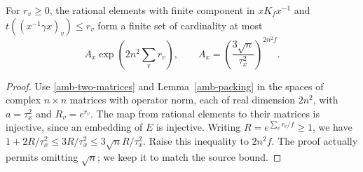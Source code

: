 \begin{corollary}\label{amb-rational-ball}
For $r_v\ge0$, the rational elements with finite component in
$xK_fx^{-1}$ and $t((x^{-1}\gamma x)_v)\le r_v$ form a finite
set of cardinality at most
\begin{equation}\label{amb-ball-bound}
 A_x\exp\left(2n^2\sum_vr_v\right),\qquad
                   A_x=\left(\frac{3\sqrt n}{\tau_x^2}\right)^{2n^2f}.
\end{equation}
\end{corollary}
\begin{proof}
Use \eqref{amb-two-matrices} and Lemma~\ref{amb-packing} in the
spaces of complex $n\times n$ matrices with operator norm,
each of real dimension $2n^2$, with $a=\tau_x^2$ and
$R_v=e^{r_v}$. The map from rational elements to their matrices
is injective, since an embedding of $E$ is injective.
Writing $R=e^{\sum_vr_v/f}\ge1$, we have
$1+2R/\tau_x^2\le3R/\tau_x^2\le3\sqrt nR/\tau_x^2$.
Raise this inequality to $2n^2f$. The proof actually permits
omitting $\sqrt n$; we keep it to match the source bound.
\end{proof}


